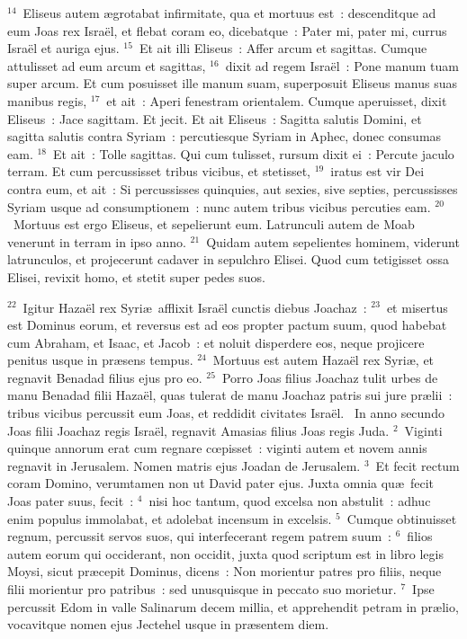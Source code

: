 ${}^{14}$~Eliseus autem \ae grotabat infirmitate, qua et mortuus est~: descenditque ad eum Joas rex Isra\"el, et flebat coram eo, dicebatque~: Pater mi, pater mi, currus Isra\"el et auriga ejus.
${}^{15}$~Et ait illi Eliseus~: Affer arcum et sagittas. Cumque attulisset ad eum arcum et sagittas,
${}^{16}$~dixit ad regem Isra\"el~: Pone manum tuam super arcum. Et cum posuisset ille manum suam, superposuit Eliseus manus suas manibus regis,
${}^{17}$~et ait~: Aperi fenestram orientalem. Cumque aperuisset, dixit Eliseus~: Jace sagittam. Et jecit. Et ait Eliseus~: Sagitta salutis Domini, et sagitta salutis contra Syriam~: percutiesque Syriam in Aphec, donec consumas eam.
${}^{18}$~Et ait~: Tolle sagittas. Qui cum tulisset, rursum dixit ei~: Percute jaculo terram. Et cum percussisset tribus vicibus, et stetisset,
${}^{19}$~iratus est vir Dei contra eum, et ait~: Si percussisses quinquies, aut sexies, sive septies, percussisses Syriam usque ad consumptionem~: nunc autem tribus vicibus percuties eam.
${}^{20}$~Mortuus est ergo Eliseus, et sepelierunt eum. Latrunculi autem de Moab venerunt in terram in ipso anno.
${}^{21}$~Quidam autem sepelientes hominem, viderunt latrunculos, et projecerunt cadaver in sepulchro Elisei. Quod cum tetigisset ossa Elisei, revixit homo, et stetit super pedes suos.


${}^{22}$~Igitur Haza\"el rex Syri\ae\ afflixit Isra\"el cunctis diebus Joachaz~:
${}^{23}$~et misertus est Dominus eorum, et reversus est ad eos propter pactum suum, quod habebat cum Abraham, et Isaac, et Jacob~: et noluit disperdere eos, neque projicere penitus usque in pr\ae sens tempus.
${}^{24}$~Mortuus est autem Haza\"el rex Syri\ae , et regnavit Benadad filius ejus pro eo.
${}^{25}$~Porro Joas filius Joachaz tulit urbes de manu Benadad filii Haza\"el, quas tulerat de manu Joachaz patris sui jure pr\ae lii~: tribus vicibus percussit eum Joas, et reddidit civitates Isra\"el.
~\lettrine[lines=10,image=true,loversize=0.05,lraise=-0.03]{I}{}n anno secundo Joas filii Joachaz regis Isra\"el, regnavit Amasias filius Joas regis Juda.
${}^{2}$~Viginti quinque annorum erat cum regnare cœpisset~: viginti autem et novem annis regnavit in Jerusalem. Nomen matris ejus Joadan de Jerusalem.
${}^{3}$~Et fecit rectum coram Domino, verumtamen non ut David pater ejus. Juxta omnia qu\ae\ fecit Joas pater suus, fecit~:
${}^{4}$~nisi hoc tantum, quod excelsa non abstulit~: adhuc enim populus immolabat, et adolebat incensum in excelsis.
${}^{5}$~Cumque obtinuisset regnum, percussit servos suos, qui interfecerant regem patrem suum~:
${}^{6}$~filios autem eorum qui occiderant, non occidit, juxta quod scriptum est in libro legis Moysi, sicut pr\ae cepit Dominus, dicens~: Non morientur patres pro filiis, neque filii morientur pro patribus~: sed unusquisque in peccato suo morietur.
${}^{7}$~Ipse percussit Edom in valle Salinarum decem millia, et apprehendit petram in pr\ae lio, vocavitque nomen ejus Jectehel usque in pr\ae sentem diem.


